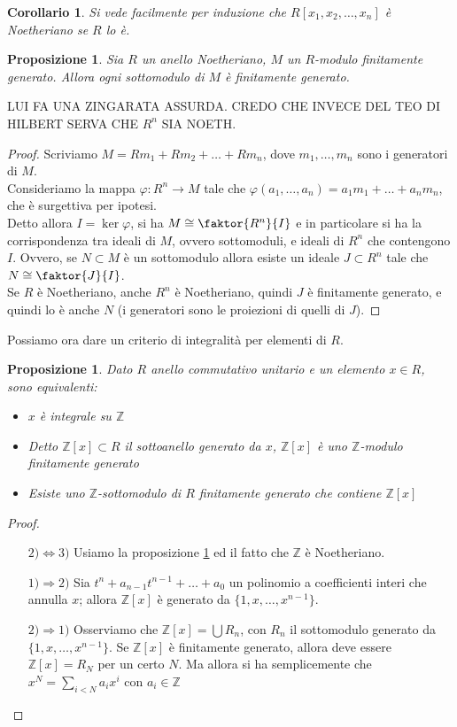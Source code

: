 \documentclass[11pt]{article}
\theoremstyle{plain}
\newtheorem{prop}[thm]{Proposizione}
\newtheorem*{cor}{Corollario}
\theoremstyle{definition}
\theoremstyle{remark}
\newcommand{\Z}{\mathbb{Z}}
\begin{document}
  \begin{cor}
   Si vede facilmente per induzione che $R[x_1,x_2,\dots,x_n]$ è Noetheriano se $R$ lo è.
  \end{cor}
  \begin{prop}\label{sottomod_fin_gen}
   Sia $R$ un anello Noetheriano, $M$ un $R$-modulo finitamente generato. Allora ogni sottomodulo di $M$ è finitamente generato.
  \end{prop}
  LUI FA UNA ZINGARATA ASSURDA. CREDO CHE INVECE DEL TEO DI HILBERT SERVA CHE $R^n$ SIA NOETH.
  \begin{proof}
   Scriviamo $M=Rm_1+Rm_2+\dots+Rm_n$, dove $m_1,\dots,m_n$ sono i generatori di $M$.\\
   Consideriamo la mappa $\varphi:R^n\to M$ tale che $\varphi(a_1,\dots,a_n)=a_1m_1+\dots+a_nm_n$, che è surgettiva per ipotesi.\\
   Detto allora $I=\ker\varphi$, si ha $M\cong\faktor{R^n}{I}$ e in particolare si ha la corrispondenza tra ideali di $M$, ovvero sottomoduli, e ideali di $R^n$ che contengono $I$.
   Ovvero, se $N\subset M$ è un sottomodulo allora esiste un ideale $J\subset R^n$ tale che $N\cong\faktor{J}{I}$.\\
   Se $R$ è Noetheriano, anche $R^n$ è Noetheriano, quindi $J$ è finitamente generato, e quindi lo è anche $N$ (i generatori sono le proiezioni di quelli di $J$).
  \end{proof}
  Possiamo ora dare un criterio di integralità per elementi di $R$.
  \begin{prop}\label{crit_integ}
   Dato $R$ anello commutativo unitario e un elemento $x\in R$, sono equivalenti:
   \begin{itemize}
    \item $x$ è integrale su $\Z$
    \item Detto $\Z[x]\subset R$ il sottoanello generato da $x$, $\Z[x]$ è uno $\Z$-modulo finitamente generato
    \item Esiste uno $\Z$-sottomodulo di $R$ finitamente generato che contiene $\Z[x]$
   \end{itemize}
  \end{prop}
  \begin{proof}
   \begin{itemize}
    \item[$2)\iff 3)$] Usiamo la proposizione \ref{sottomod_fin_gen} ed il fatto che $\Z$ è Noetheriano.
    \item[$1)\Rightarrow2)$] Sia $t^n+a_{n-1}t^{n-1}+\dots+a_0$ un polinomio a coefficienti interi che annulla $x$; allora $\Z[x]$ è generato da $\{1,x,\dots,x^{n-1}\}$.
    \item[$2)\Rightarrow1)$] Osserviamo che $\Z[x]=\bigcup R_n$, con $R_n$ il sottomodulo generato da $\{1,x,\dots,x^{n-1}\}$. Se $\Z[x]$ è finitamente generato, allora deve essere $\Z[x]=R_N$ per un certo $N$.
    Ma allora si ha semplicemente che $x^N=\sum_{i<N}a_ix^i$ con $a_i\in\Z$
   \end{itemize}
  \end{proof}
\end{document}
